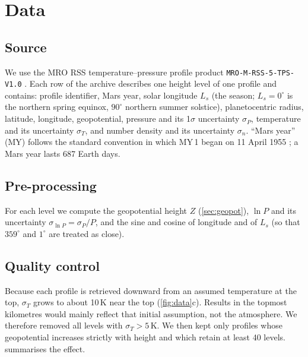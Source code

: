 \documentclass[11pt,a4paper]{article}
\begin{document}
\section{Data}\label{sec:data}

\subsection{Source}
We use the MRO RSS temperature--pressure profile product \texttt{MRO-M-RSS-5-TPS-V1.0} \citep{hinsonPDS}. Each row of the archive describes one height level of one profile and contains: profile identifier, Mars year, solar longitude $L_s$ (the season; $L_s=0^\circ$ is the northern spring equinox, $90^\circ$ northern summer solstice), planetocentric radius, latitude, longitude, geopotential, pressure and its 1$\sigma$ uncertainty $\sigma_P$, temperature and its uncertainty $\sigma_T$, and number density and its uncertainty $\sigma_n$. ``Mars year'' (MY) follows the standard convention in which MY\,1 began on 11 April 1955 \citep{clancy2000}; a Mars year lasts 687 Earth days.

\subsection{Pre-processing}
For each level we compute the geopotential height $Z$ (\cref{sec:geopot}), $\ln P$ and its uncertainty $\sigma_{\ln P}=\sigma_P/P$, and the sine and cosine of longitude and of $L_s$ (so that $359^\circ$ and $1^\circ$ are treated as close).

\subsection{Quality control}
Because each profile is retrieved downward from an assumed temperature at the top, $\sigma_T$ grows to about 10\,K near the top (\cref{fig:data}c). Results in the topmost kilometres would mainly reflect that initial assumption, not the atmosphere. We therefore removed all levels with $\sigma_T>5$\,K. We then kept only profiles whose geopotential increases strictly with height and which retain at least 40 levels.  summarises the effect.
\end{document}
